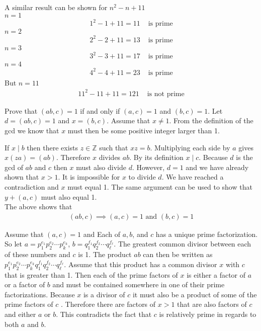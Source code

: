\documentclass[paper=a4, fontsize=11pt]{jhwhw} %
\begin{document}
A similar result can be shown for $n^2-n + 11$\\
$n=1$
\begin{align}
1^2 - 1 +11 = 11&\text{ is prime}
\end{align}
$n=2$
\begin{align}
2^2 - 2 +11=13&\text{ is prime}
\end{align}
$n=3$
\begin{align}
3^2 - 3 +11=17&\text{ is prime}
\end{align}
$n=4$
\begin{align}
4^2 - 4 +11=23&\text{ is prime}
\end{align}
But $n=11$
\begin{align}
11^2 - 11 +11=121&\text{ is not prime}
\end{align}


Prove that $\left(ab, c\right) = 1$ if and only if $\left(a, c\right) = 1$ and $\left(b, c\right)=1$.
\solution
Let $d = \left(ab,c\right)=1$ and $x = \left(b, c\right)$. Assume that $x\not= 1$. From the definition of the gcd we know that $x$ must then be some positive integer larger than 1.

If $x\mid b$ then there exists $z\in \mathbb Z$ such that $xz=b$. Multiplying each side by $a$ gives $x\left(za\right) = \left(ab\right)$. Therefore $x$ divides $ab$. By its definition $x\mid c$. Because $d$ is the gcd of $ab$ and $c$ then $x$ must also divide $d$. However, $d=1$ and we have already shown that $x>1$. It is impossible for $x$ to divide $d$. We have reached a contradiction and $x$ must equal 1. The same argument can be used to show that $y+\left(a, c\right)$ must also equal 1.\\

The above shows that
\begin{align}
\left(ab, c\right) \implies \left(a, c\right) = 1\text{ and }\left(b, c\right) = 1
\end{align}

Assume that $(a, c)=1$ and Each of $a, b$, and $c$ has a unique prime factorization. So let $a=p_1^{e_1} p_2^{e_2}\cdots p_k^{e_k}$, $b=q_1^{f_1} q_2^{f_2} \cdots q_\ell^{f_\ell}$. The greatest common divisor between each of these numbers and $c$ is 1. The product $ab$ can then be written as $p_1^{e_1} p_2^{e_2}\cdots p_k^{e_k} q_1^{f_1} q_2^{f_2} \cdots q_\ell^{f_\ell}$. Assume that this product has a common divisor $x$ with $c$ that is greater than 1. Then each of the prime factors of $x$ is either a factor of $a$ or a factor of $b$ and must be contained somewhere in one of their prime factorizations. Because $x$ is a divisor of $c$ it must also be a product of some of the prime factors of $c$ . Therefore there are factors of $x>1$ that are also factors of $c$ and either $a$ or $b$. This contradicts the fact that $c$ is relatively prime in regards to both $a$ and $b$.\\
\end{document}
